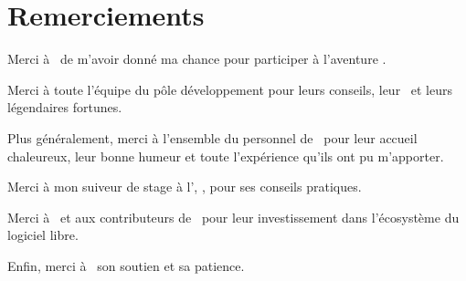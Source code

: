 \section*{Remerciements}

Merci à \ahugon\ de m'avoir donné ma chance pour participer à l'aventure \asl.

Merci à toute l'équipe du pôle développement pour leurs conseils, leur \acoaching\ et leurs légendaires fortunes.

Plus généralement, merci à l'ensemble du personnel de \asensio\ pour leur accueil chaleureux, leur bonne humeur et toute l'expérience qu'ils ont pu m'apporter.

Merci à mon suiveur de stage à l'\autc, \asuiveur, pour ses conseils pratiques.

Merci à \apotencier\ et aux contributeurs de \asf\ pour leur investissement dans l'écosystème du logiciel libre.

Enfin, merci à \asarah\ son soutien et sa patience.
